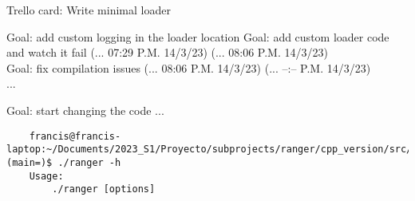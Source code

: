 \documentclass[12pt,oneside]{book}
\begin{document}
  Trello card: Write minimal loader

  Goal: add custom logging in the loader location 
  Goal: add custom loader code and watch it fail (... 07:29 P.M. 14/3/23) (... 08:06 P.M. 14/3/23) \\
  Goal: fix compilation issues (... 08:06 P.M. 14/3/23) (... --:-- P.M. 14/3/23) \\
  
  ...

  Goal: start changing the code ... \\


  \begin{lstlisting}
    francis@francis-laptop:~/Documents/2023_S1/Proyecto/subprojects/ranger/cpp_version/src/build (main=)$ ./ranger -h
    Usage: 
        ./ranger [options]
    

\end{lstlisting}
\end{document}
